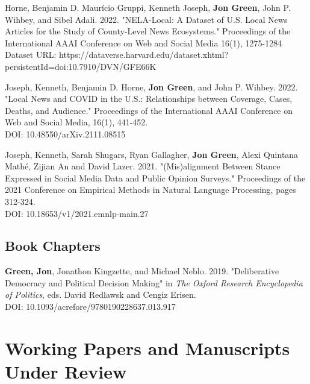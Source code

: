 \documentclass[letterpaper]{article}
\begin{document}
\begin{etaremune}
\item Horne, Benjamin D. Maur\'{i}cio Gruppi, Kenneth Joseph, \textbf{Jon Green}, John P. Wihbey, and Sibel Adali. 2022. "NELA-Local: A Dataset of U.S. Local News Articles for the Study of County-Level News Ecosystems." Proceedings of the International AAAI Conference on Web and Social Media 16(1), 1275-1284\\
Dataset URL: https://dataverse.harvard.edu/dataset.xhtml?persistentId=doi:10.7910/DVN/GFE66K

\item Joseph, Kenneth, Benjamin D. Horne, \textbf{Jon Green}, and John P. Wihbey. 2022. "Local News and COVID in the U.S.: Relationships between Coverage, Cases, Deaths, and Audience." Proceedings of the International AAAI Conference on Web and Social Media, 16(1), 441-452.\\
DOI: 10.48550/arXiv.2111.08515

\item Joseph, Kenneth, Sarah Shugars, Ryan Gallagher, \textbf{Jon Green}, Alexi Quintana Mathé, Zijian An and David Lazer. 2021. "(Mis)alignment Between Stance Expressed in Social Media Data and Public Opinion Surveys." Proceedings of the 2021 Conference on Empirical Methods in Natural Language Processing, pages 312-324. \\
DOI: 10.18653/v1/2021.emnlp-main.27
\end{etaremune}

\subsection*{Book Chapters}

\begin{etaremune}
\item \textbf{Green, Jon}, Jonathon Kingzette, and Michael Neblo. 2019. "Deliberative Democracy and Political Decision Making" in \textit{The Oxford Research Encyclopedia of Politics}, eds. David Redlawsk and Cengiz Erisen.\\
DOI: 10.1093/acrefore/9780190228637.013.917
\end{etaremune}

\section*{Working Papers and Manuscripts Under Review}

\end{document}
